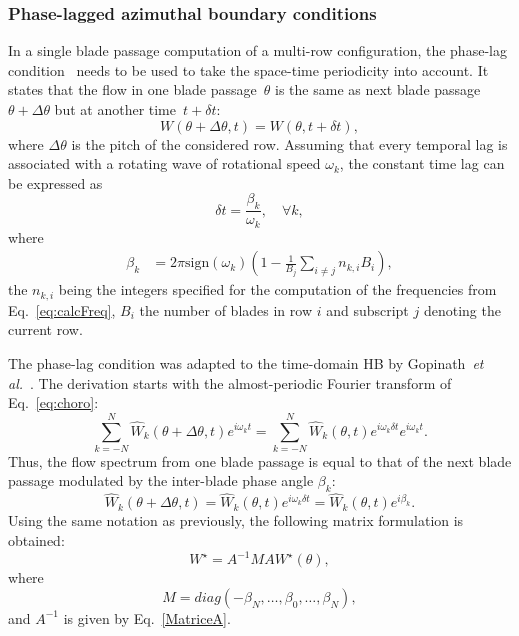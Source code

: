 \subsubsection{Phase-lagged azimuthal boundary conditions}
\label{sec:BC}

In a single blade passage computation of a multi-row configuration,
the phase-lag condition~\cite{Erdos1977} needs to be used to take the
space-time periodicity into account.  It states that the flow in one
blade passage~$\theta$ is the same as next blade
passage~$\theta+\Delta\theta$ but at another time~$t+\delta t$:
\begin{equation}
  W\left(\theta+\Delta\theta,t \right) = W\left(\theta,t+\delta t \right),
  \label{eq:choro}
\end{equation}
where $\Delta \theta$ is the pitch of the considered row. Assuming
that every temporal lag is associated with a rotating wave of rotational
speed $\omega_k$, the constant time lag can be expressed as
\begin{equation}
  \delta t = \frac{\beta_k}{\omega_k},\quad\forall k,
\end{equation}
where 
\begin{equation}
  \begin{split}
  \beta_k &= 2\pi \text{sign}(\omega_k)\left(
    1-\frac{1}{B_j}
    \sum_{i\neq j} n_{k,i}B_i \right), 
  \end{split}
\end{equation}
the $n_{k,i}$ being the integers specified for the computation of the
frequencies from Eq.~\eqref{eq:calcFreq}, $B_i$ the number of
blades in row $i$ and subscript $j$ denoting the current row.

The phase-lag condition was adapted to the time-domain HB by
Gopinath~\emph{et al.}~\cite{Gopinath2005}. The derivation starts with
the almost-periodic Fourier transform of Eq.~\eqref{eq:choro}:
\begin{equation}
  \sum_{k=-N}^{N} \widehat{W}_k\left(\theta+\Delta\theta,t \right)
  e^{i\omega_k t} = \sum_{k=-N}^{N} \widehat{W}_k\left(\theta,t
  \right)e^{i\omega_k \delta t} e^{i\omega_k t}.
  \label{eq:choroFourier_2}
\end{equation}
Thus, the flow spectrum from one blade passage is equal to that of the
next blade passage modulated by the inter-blade phase angle $\beta_k$:
\begin{equation}
  \widehat{W}_k\left( \theta+\Delta\theta,t \right) =
  \widehat{W}_k\left( \theta,t \right) e^{i\omega_k \delta t} = 
  \widehat{W}_k\left( \theta,t \right) e^{i\beta_k}.
  \label{eq:tmp}
\end{equation}
Using the same notation as previously, the following matrix
formulation is obtained:
\begin{equation}
  W^{\star} = A^{-1}MAW^{\star}\left( \theta \right),
  \label{eq:choroMatrix}
\end{equation}
where
\begin{equation}
  M = diag \left( -\beta_N,\ldots,\beta_0,\ldots,\beta_N \right),
\end{equation}
and $A^{-1}$ is given by Eq.~\eqref{MatriceA}.

